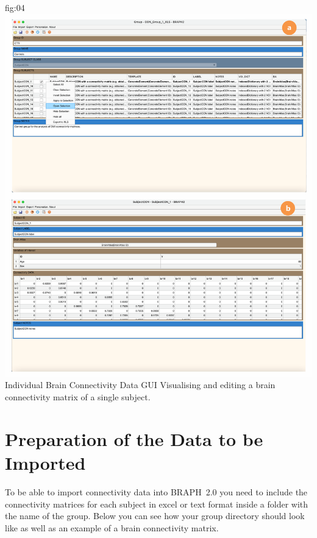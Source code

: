 \documentclass[justified]{tufte-handout}
\begin{document}
	{fig:04}
	{\includegraphics{fig04.png}
	}
	{Individual Brain Connectivity Data GUI}
	{
	Visualising and editing a brain connectivity matrix of a single subject. 
	}

\section{Preparation of the Data to be Imported}

To be able to import connectivity data into BRAPH~2.0 you need to include the connectivity matrices for each subject in excel or text format inside a folder with the name of the group. Below you can see how your group directory should look like as well as an example of a brain connectivity matrix.
\end{document}
